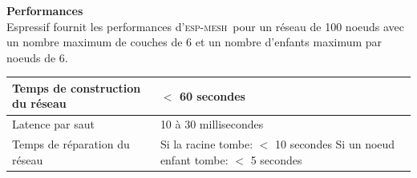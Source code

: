\documentclass[a4paper, 12pt]{report}
\newcommand{\espmesh}{\textsc{esp-mesh}}
\begin{document}
    \vspace{0.5cm}
    \textbf{Performances}\\
        Espressif fournit les performances d'\espmesh\ pour un réseau de 100 noeuds avec un nombre maximum de couches de 6 et un nombre d'enfants maximum par noeuds de 6.
        \newline

        \begin{tabular}{|l|l|}
            \hline
            Temps de construction du réseau & $<$ 60 secondes\\ \hline
            Latence par saut & 10 à 30 millisecondes\\ \hline
            Temps de réparation du réseau & \makecell{Si la racine tombe: $<$ 10 secondes \\ Si un noeud enfant tombe: $<$ 5 secondes}\\ \hline
        \end{tabular}

{}

\end{document}
